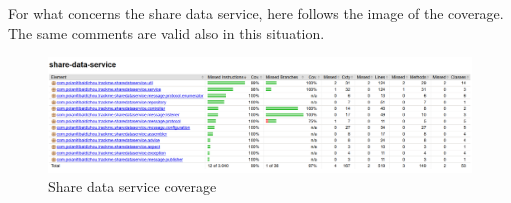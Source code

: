 \par
For what concerns the share data service, here follows the image of the coverage. The same comments
are valid also in this situation.

\begin{figure}[H]
\includegraphics[width=\linewidth]{images/CoverageSharedataservice.png}
\caption{ Share data service coverage}
\label{fig:cvgshare}
\end{figure}


